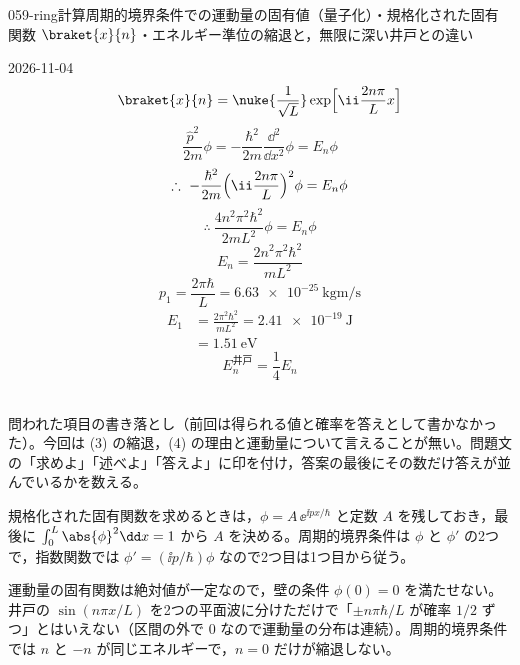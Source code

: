 \documentclass[uplatex,dvipdfmx,a4paper,11pt]{jsarticle}
\begin{document}
\begin{mondai}{059-ring}{計算}{周期的境界条件での運動量の固有値（量子化）・規格化された固有関数 $\braket{x}{n}$・エネルギー準位の縮退と，無限に深い井戸との違い}
\begin{kotaeutsushi}{2026-11-04}
\[ \braket{x}{n}=\nuke{\frac{1}{\sqrt{L}}}\exp\Bigl[\ii\frac{2n\pi}{L}x\Bigr] \]
\[ \frac{\hat{p}^{2}}{2m}\phi=-\frac{\hbar^{2}}{2m}\frac{\dd^{2}}{\dd x^{2}}\phi=E_{n}\phi \]
\[ \therefore\ -\frac{\hbar^{2}}{2m}\Bigl(\ii\frac{2n\pi}{L}\Bigr)^{2}\phi=E_{n}\phi \]
\[ \therefore\ \frac{4n^{2}\pi^{2}\hbar^{2}}{2mL^{2}}\phi=E_{n}\phi \]
\[ E_{n}=\frac{2n^{2}\pi^{2}\hbar^{2}}{mL^{2}} \]
\[ p_{1}=\frac{2\pi\hbar}{L}=\qty{6.63e-25}{\kilogram\metre\per\second} \]
\begin{align*}
E_{1}&=\frac{2\pi^{2}\hbar^{2}}{mL^{2}}=\qty{2.41e-19}{\joule}\\
&=\qty{1.51}{\electronvolt}
\end{align*}
\[ E_{n}^{\text{井戸}}=\frac{1}{4}E_{n} \]
\ 
\end{kotaeutsushi}
\begin{kizuki}
\item {} 問われた項目の書き落とし（前回は得られる値と確率を答えとして書かなかった）。今回は (3) の縮退，(4) の理由と運動量について言えることが無い。問題文の「求めよ」「述べよ」「答えよ」に印を付け，答案の最後にその数だけ答えが並んでいるかを数える。
\item 規格化された固有関数を求めるときは，$\phi=A\,\ee^{\ii px/\hbar}$ と定数 $A$ を残しておき，最後に $\int_{0}^{L}\abs{\phi}^{2}\dd x=1$ から $A$ を決める。周期的境界条件は $\phi$ と $\phi'$ の2つで，指数関数では $\phi'=(\ii p/\hbar)\phi$ なので2つ目は1つ目から従う。
\item 運動量の固有関数は絶対値が一定なので，壁の条件 $\phi(0)=0$ を満たせない。井戸の $\sin(n\pi x/L)$ を2つの平面波に分けただけで「$\pm n\pi\hbar/L$ が確率 $1/2$ ずつ」とはいえない（区間の外で $0$ なので運動量の分布は連続）。周期的境界条件では $n$ と $-n$ が同じエネルギーで，$n=0$ だけが縮退しない。

\end{kizuki}
\end{mondai}
\end{document}
